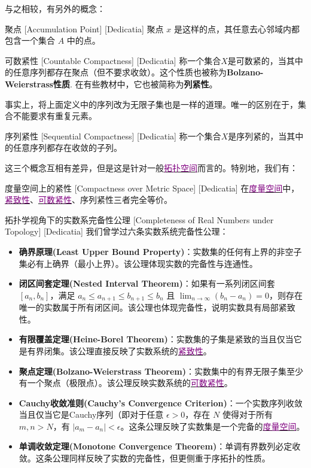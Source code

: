 \documentclass[UTF8]{ctexart}
\newcommand{\hyperrefc}[2]{\hyperref[#1]{\textcolor{purple}{#2}}}
\begin{document}
与之相较，有另外的概念：
\begin{dfn}
    [UUID]
    {聚点}
    [Accumulation Point]
    [Dedicatia]
    聚点 \( x \) 是这样的点，其任意去心邻域内都包含一个集合 \( A \) 中的点。
\end{dfn}
\begin{dfn}
    [UUID]
    {可数紧性\label{dfn:CountableCompactness}}
    [Countable Compactness]
    [Dedicatia]
    称一个集合$X$是可数紧的，当其中的任意序列都存在聚点（但不要求收敛）。这个性质也被称为\textbf{Bolzano-Weierstrass性质}. 在有些教材中，它也被简称为\textbf{列紧性}。
\end{dfn}
事实上，将上面定义中的序列改为无限子集也是一样的道理。唯一的区别在于，集合不能要求有重复元素。
\begin{dfn}
    [UUID]
    {序列紧性}
    [Sequential Compactness]
    [Dedicatia]
    称一个集合$X$是序列紧的，当其中的任意序列都存在收敛的子列。
\end{dfn}
这三个概念互相有差异，但是这是针对一般\hyperrefc{dfn:TopologicalSpace}{拓扑空间}而言的。特别地，我们有：
\begin{thm}
    [UUID]
    {度量空间上的紧性}
    [Compactness over Metric Space]
    [Dedicatia]
    在\hyperrefc{dfn:MetricSpace}{度量空间}中，\hyperrefc{dfn:Compactness}{紧致性}、\hyperrefc{dfn:CountableCompactness}{可数紧性}、序列紧性三者完全等价。
\end{thm}
\begin{xmp}
    [UUID]
    {拓扑学视角下的实数系完备性公理}
    [Completeness of Real Numbers under Topology]
    [Dedicatia]
    我们曾学过六条实数系统完备性公理：
    \begin{itemize}
        \item \textbf{确界原理(Least Upper Bound Property)}：实数集的任何有上界的非空子集必有上确界（最小上界）。该公理体现实数的完备性与连通性。
        \item \textbf{闭区间套定理(Nested Interval Theorem)}：如果有一系列闭区间套 \([a_n, b_n]\)，满足 \(a_n \leq a_{n+1} \leq b_{n+1} \leq b_n\) 且 \(\lim_{n \to \infty} (b_n - a_n) = 0\)，则存在唯一的实数属于所有闭区间。该公理也体现完备性，说明实数具有局部紧致性。
        \item \textbf{有限覆盖定理(Heine-Borel Theorem)}：实数集的子集是紧致的当且仅当它是有界闭集。该公理直接反映了实数系统的\hyperrefc{dfn:Compactness}{紧致性}。
        \item \textbf{聚点定理(Bolzano-Weierstrass Theorem)}：实数集中的有界无限子集至少有一个聚点（极限点）。该公理反映实数系统的\hyperrefc{dfn:CountableCompactness}{可数紧性}。
        \item \textbf{Cauchy收敛准则(Cauchy's Convergence Criterion)}：一个实数序列收敛当且仅当它是Cauchy序列（即对于任意 \(\epsilon > 0\)，存在 \(N\) 使得对于所有 \(m, n > N\)，有 \(|a_m - a_n| < \epsilon\)。这条公理反映了实数集是一个完备的\hyperrefc{dfn:MetricSpace}{度量空间}。
        \item \textbf{单调收敛定理(Monotone Convergence Theorem)}：单调有界数列必定收敛。这条公理同样反映了实数的完备性，但更侧重于序拓扑的性质。
    \end{itemize}
\end{xmp}
\end{document}
